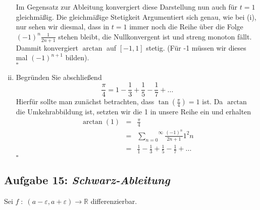 \documentclass[11pt,a4paper,ngerman]{article}
\begin{document}
\begin{enumerate}[(i)]
        Im Gegensatz zur Ableitung konvergiert diese Darstellung nun auch für $t=1$ gleichmäßig.
        Die gleichmäßige Stetigkeit Argumentiert sich genau, wie bei (i), nur sehen wir diesmal,
        dass in $t=1$ immer noch die Reihe über die Folge $(-1)^n \frac{1}{2n+1}$ stehen bleibt,
        die Nullkonvergent ist und streng monoton fällt. Dammit konvergiert $\arctan$ auf $[-1,1]$ stetig.
        (Für -1 müssen wir dieses mal $(-1)^{n+1}$ bilden).\\
        \mbox{} \hfill $\square$

    \item Begründen Sie abschließend
        $$
            \frac{\pi}{4} = 1 - \frac{1}{3} + \frac{1}{5} - \frac{1}{7} + ...
        $$
        Hierfür sollte man zunächst betrachten, dass $\tan(\frac{\pi}{4}) = 1$ ist. Da $\arctan$ die
        Umkehrabbildung ist, setzten wir die 1 in unsere Reihe ein und erhalten
        $$\begin{array}{rcl}
            \arctan (1) &=& \frac{\pi}{4} \\
                &=& \overset{\infty}{\underset{n=0}{\sum}} \frac{(-1)^n}{2n+1}1^2n\\
                &=& \frac{1}{1} - \frac{1}{3} + \frac{1}{5} - \frac{1}{7} + ...
        \end{array}$$
        \mbox{} \hfill $\square$
\end{enumerate}

\subsection*{Aufgabe 15: \mdseries\itshape Schwarz-Ableitung}
Sei $f \; : \; (a - \varepsilon, a +\varepsilon) \longrightarrow \mathbb{R}$ differenzierbar.
\end{document}
